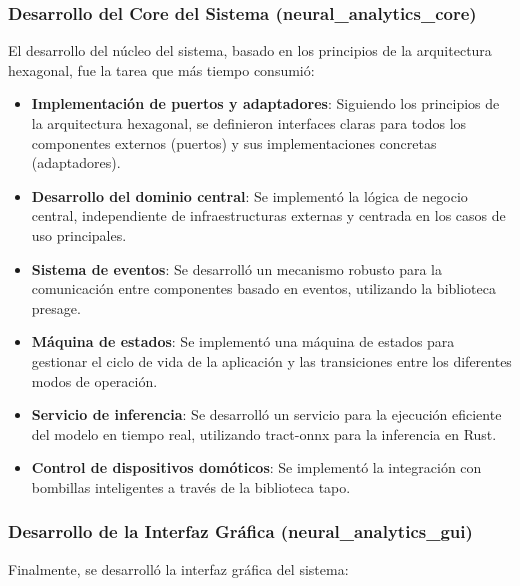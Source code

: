 \subsubsection{Desarrollo del Core del Sistema (neural\_analytics\_core)}

El desarrollo del núcleo del sistema, basado en los principios de la arquitectura hexagonal, fue la tarea que más tiempo consumió:

\begin{itemize}
    \item \textbf{Implementación de puertos y adaptadores}: Siguiendo los principios de la arquitectura hexagonal, se definieron interfaces claras para todos los componentes externos (puertos) y sus implementaciones concretas (adaptadores).
    
    \item \textbf{Desarrollo del dominio central}: Se implementó la lógica de negocio central, independiente de infraestructuras externas y centrada en los casos de uso principales.
    
    \item \textbf{Sistema de eventos}: Se desarrolló un mecanismo robusto para la comunicación entre componentes basado en eventos, utilizando la biblioteca presage.
    
    \item \textbf{Máquina de estados}: Se implementó una máquina de estados para gestionar el ciclo de vida de la aplicación y las transiciones entre los diferentes modos de operación.
    
    \item \textbf{Servicio de inferencia}: Se desarrolló un servicio para la ejecución eficiente del modelo en tiempo real, utilizando tract-onnx para la inferencia en Rust.
    
    \item \textbf{Control de dispositivos domóticos}: Se implementó la integración con bombillas inteligentes a través de la biblioteca tapo.
\end{itemize}

\subsubsection{Desarrollo de la Interfaz Gráfica (neural\_analytics\_gui)}

Finalmente, se desarrolló la interfaz gráfica del sistema:

